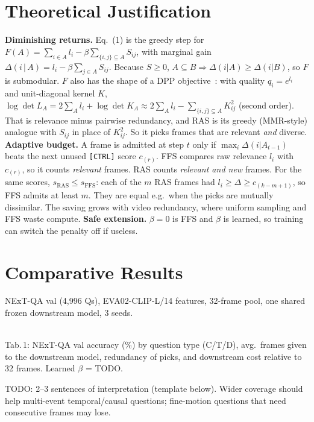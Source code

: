 \section{Theoretical Justification}
\textbf{Diminishing returns.} Eq.~(1) is the greedy step for
$F(A)=\sum_{i\in A}l_i-\beta\sum_{\{i,j\}\subseteq A}S_{ij}$, with marginal gain
$\Delta(i\,|\,A)=l_i-\beta\sum_{j\in A}S_{ij}$. Because $S\ge 0$, $A\subseteq B\Rightarrow\Delta(i|A)\ge\Delta(i|B)$, so $F$ is
submodular. $F$ also has the shape of a DPP
objective~\cite{kulesza2012dpp}: with quality $q_i=e^{l_i}$ and unit-diagonal kernel $K$,
$\log\det L_A=2\sum_{A}l_i+\log\det K_A\approx 2\sum_{A}l_i-\sum_{\{i,j\}\subseteq A}K_{ij}^2$ (second order). That is
relevance minus pairwise redundancy, and RAS is its greedy (MMR-style) analogue with $S_{ij}$ in place of $K_{ij}^2$.
So it picks frames that are relevant \emph{and} diverse.
\textbf{Adaptive budget.} A frame is admitted at step $t$ only if $\max_i\Delta(i|A_{t-1})$ beats the next unused
\texttt{[CTRL]} score $c_{(r)}$. FFS compares raw relevance $l_i$ with $c_{(r)}$, so it counts \emph{relevant} frames.
RAS counts \emph{relevant and new} frames. For the same scores, $s_{\text{RAS}}\le s_{\text{FFS}}$: each of the
$m$ RAS frames had $l_i\ge\Delta\ge c_{(k-m+1)}$, so FFS admits at least $m$. They are equal e.g.\ when the picks are
mutually dissimilar. The saving grows with video redundancy, where uniform sampling and FFS waste compute.
\textbf{Safe extension.} $\beta{=}0$ is FFS and $\beta$ is learned, so training can switch the penalty off if useless.

\section{Comparative Results}
NExT-QA val (4{,}996 Qs), EVA02-CLIP-L/14 features, 32-frame pool, one shared frozen downstream model, 3 seeds.
\begin{center}\footnotesize
\\[2pt] Tab.\,1: NExT-QA val accuracy (\%) by question type (C/T/D), avg.\ frames given to the downstream model,
redundancy of picks, and downstream cost relative to 32 frames. Learned $\beta$ = TODO.
\end{center}
TODO: 2--3 sentences of interpretation (template below). Wider coverage should help multi-event temporal/causal questions;
fine-motion questions that need consecutive frames may lose.

